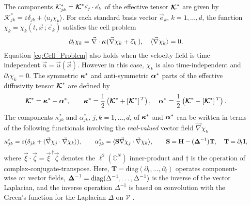 \documentclass[11pt]{amsart}
\newcommand{\Tb}{\mathbf{T}}
\newcommand{\Hb}{\mathbf{H}}
\newcommand{\Ib}{\mathbf{I}}
\newcommand{\Sb}{\mathbf{S}}
\newcommand{\Kc}{\mathcal{K}}
\newcommand\Kbc{\mbox{\boldmath${\mathcal{K}}$}}
\newcommand{\Vc}{\mathcal{V}}
\newcommand\balpha{\mbox{\boldmath${\alpha}$}}
\newcommand\bDelta{\mbox{\boldmath${\Delta}$}}
\newcommand\bkappa{\mbox{\boldmath${\kappa}$}}
\begin{document}
The components $\Kc^*_{jk}=\Kbc^*\vec{e}_j\cdot\vec{e}_k$ of the effective
tensor $\Kbc^*$ are given by $\Kc^*_{jk}=\varepsilon\delta_{jk}+\langle u_j\chi_k\rangle$. For each
standard basis vector $\vec{e}_k$, $k=1,\ldots,d$, the function
$\chi_k=\chi_k(t,\vec{x}\,;\vec{e}_k)$ satisfies
\cite{Fannjiang:SIAM_JAM:333} the cell problem    
% 
\begin{align}\label{eq:Cell_Problem}
  \partial_t\chi_k=\vec{\nabla}\cdot\bkappa(\vec{\nabla}\chi_k+\vec{e}_k\,), \quad
  \langle\vec{\nabla}\chi_k\rangle=0.
\end{align}
%
Equation \eqref{eq:Cell_Problem} also holds
\cite{Fannjiang:SIAM_JAM:333} when the velocity field is
time-independent $\vec{u}=\vec{u}(\vec{x})$. However in this case, 
$\chi_k$ is also time-independent and $\partial_t\chi_k=0$. The symmetric $\bkappa^*$ and
anti-symmetric $\balpha^*$ parts of the effective diffusivity tensor
$\Kbc^*$ are defined by 
%
\begin{align}\label{eq:Symm_Anti-Symm}
  \Kbc^*=\bkappa^*+\balpha^*,\qquad
  \bkappa^*=\frac{1}{2}\left(\Kbc^*+[\Kbc^*]^{\,T}\right), \quad
  \balpha^*=\frac{1}{2}\left(\Kbc^*-[\Kbc^*]^{\,T}\right).
\end{align}
%
The components $\kappa^*_{jk}$ and $\alpha^*_{jk}$, $j,k=1,\ldots,d$, of $\bkappa^*$
and $\balpha^*$ can be written in terms of the following functionals
involving the \emph{real-valued} vector field $\vec{\nabla}\chi_k$
%
\begin{align}\label{eq:Eff_Diffusivity}
 \kappa^*_{jk}=\varepsilon(\delta_{jk}+\langle\vec{\nabla}\chi_j\cdot\vec{\nabla}\chi_k\rangle), \qquad
 \alpha^*_{jk}=\langle\Sb\vec{\nabla}\chi_j\cdot\vec{\nabla}\chi_k\rangle, \qquad
 \Sb=\Hb-(\bDelta^{-1})\Tb, \quad \Tb=\partial_t\Ib,
\end{align}
%
where $\vec{\xi}\cdot\vec{\zeta}=\vec{\xi}^{\,\dagger}\vec{\zeta}$ denotes the
$\ell^2(\mathbb{C}^N)$ inner-product and $\dagger$ is the operation of
complex-conjugate-transpose.  
Here, $\Tb=\text{diag}(\partial_t,\ldots,\partial_t)$ operates component-wise on vector
fields, $\bDelta^{-1}=\text{diag}(\Delta^{-1},\ldots,\Delta^{-1})$ is the inverse of
the vector Laplacian, and the inverse operation $\Delta^{-1}$ is based on
convolution with the Green's function for the Laplacian $\Delta$ on $\Vc$
\cite{Stakgold:BVP:2000}.
\end{document}
